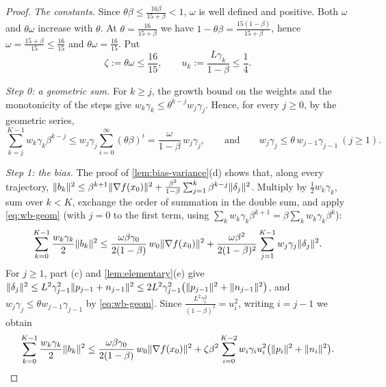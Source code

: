 \begin{proof}
\emph{The constants.} Since $\theta\beta\le\frac{16\beta}{15+\beta}<1$, $\omega$ is well
defined and positive. Both $\omega$ and $\theta\omega$ increase with $\theta$. At
$\theta=\frac{16}{15+\beta}$ we have $1-\theta\beta=\frac{15(1-\beta)}{15+\beta}$, hence
$\omega=\frac{15+\beta}{15}\le\frac{16}{15}$ and $\theta\omega=\frac{16}{15}$. Put
\[
  \zeta:=\theta\omega\le\frac{16}{15},\qquad u_k:=\frac{L\gamma_k}{1-\beta}\le\frac14 .
\]

\emph{Step 0: a geometric sum.} For $k\ge j$, the growth bound on the weights and the
monotonicity of the steps give $w_k\gamma_k\le\theta^{k-j}w_j\gamma_j$. Hence, for every $j\ge0$, by the geometric series,
\begin{equation}\label{eq:wb-geom}
  \sum_{k=j}^{K-1}w_k\gamma_k\beta^{k-j}\le w_j\gamma_j\sum_{i=0}^\infty(\theta\beta)^i
  =\frac{\omega}{1-\beta}\,w_j\gamma_j ,
  \qquad\text{and}\qquad w_j\gamma_j\le\theta\,w_{j-1}\gamma_{j-1}\ (j\ge1).
\end{equation}

\emph{Step 1: the bias.} The proof of \cref{lem:bias-variance}(d) shows that, along every
trajectory,
$\lVert b_k\rVert^2\le\beta^{k+1}\lVert \nabla f(x_0)\rVert^2+\frac{\beta^2}{1-\beta}\sum_{j=1}^k\beta^{k-j}\lVert \delta_j\rVert^2$.
Multiply by $\frac12w_k\gamma_k$, sum over $k<K$, exchange the order of summation in the
double sum, and apply \eqref{eq:wb-geom} (with $j=0$ to the first term, using
$\sum_kw_k\gamma_k\beta^{k+1}=\beta\sum_kw_k\gamma_k\beta^k$):
\[
  \sum_{k=0}^{K-1}\frac{w_k\gamma_k}{2}\lVert b_k\rVert^2
  \le\frac{\omega\beta\gamma_0}{2(1-\beta)}\,w_0\lVert \nabla f(x_0)\rVert^2
  +\frac{\omega\beta^2}{2(1-\beta)^2}\sum_{j=1}^{K-1}w_j\gamma_j\lVert \delta_j\rVert^2 .
\]
For $j\ge1$, part (c) and \cref{lem:elementary}(e) give
$\lVert \delta_j\rVert^2\le L^2\gamma_{j-1}^2\lVert p_{j-1}+n_{j-1}\rVert^2\le2L^2\gamma_{j-1}^2\bigl(\lVert p_{j-1}\rVert^2+\lVert n_{j-1}\rVert^2\bigr)$,
and $w_j\gamma_j\le\theta w_{j-1}\gamma_{j-1}$ by \eqref{eq:wb-geom}. Since
$\frac{L^2\gamma_i^2}{(1-\beta)^2}=u_i^2$, writing $i=j-1$ we obtain
\begin{equation}\label{eq:wb-bias}
  \sum_{k=0}^{K-1}\frac{w_k\gamma_k}{2}\lVert b_k\rVert^2
  \le\frac{\omega\beta\gamma_0}{2(1-\beta)}\,w_0\lVert \nabla f(x_0)\rVert^2
  +\zeta\beta^2\sum_{i=0}^{K-2}w_i\gamma_iu_i^2\bigl(\lVert p_i\rVert^2+\lVert n_i\rVert^2\bigr).
\end{equation}


\end{proof}
